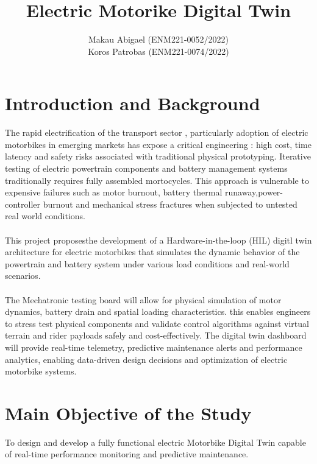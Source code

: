 \documentclass[12pt, a4paper]{article}
\title{\textbf{Electric Motorike Digital Twin}}
\author{
  \Large Makau Abigael  (ENM221-0052/2022) \\
  \Large Koros Patrobas  (ENM221-0074/2022)
}
\date{}
\begin{document}
\maketitle

\section {Introduction and Background}
\large 
The rapid electrification of the transport sector , particularly adoption of electric motorbikes in emerging markets has expose a critical engineering : high cost, time latency and safety risks associated with traditional physical prototyping. Iterative testing of electric powertrain components and battery management systems traditionally requires fully assembled mortocycles. This approach is vulnerable to expensive failures such as motor burnout, battery thermal runaway,power-controller burnout and mechanical stress fractures when subjected to untested real world conditions.
\paragraph{}This project proposesthe development of a Hardware-in-the-loop (HIL) digitl twin architecture for electric motorbikes that simulates the dynamic behavior of the powertrain and battery system under various load conditions and real-world scenarios. 
\paragraph{}The Mechatronic testing board will allow for physical simulation of motor dynamics, battery drain and spatial loading characteristics. this enables engineers to stress test physical components and validate control algorithms against virtual terrain and rider payloads safely and cost-effectively. The digital twin dashboard will provide real-time telemetry, predictive maintenance alerts and performance analytics, enabling data-driven design decisions and optimization of electric motorbike systems. 
\section{Main Objective of the Study}
To design and develop a fully functional electric Motorbike Digital Twin
capable of real-time performance monitoring and predictive maintenance.
\end{document}
